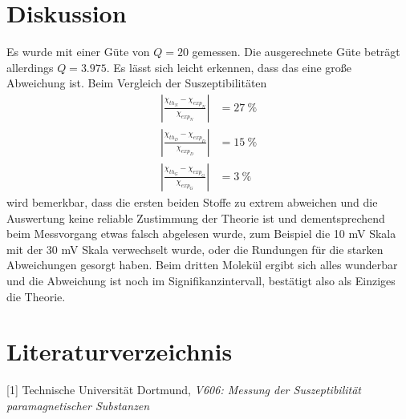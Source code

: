 \documentclass[a4paper]{scrartcl}
\begin{document}
\section{Diskussion}
Es wurde mit einer Güte von $Q=20$ gemessen. Die ausgerechnete Güte beträgt allerdings $Q=3.975$. Es lässt sich leicht erkennen, dass das eine große Abweichung ist. 
Beim Vergleich der Suszeptibilitäten 
\begin{align*}
  |\frac{\chi_{th_{N}}-\chi_{exp_{N}}}{\chi_{exp_{N}}}|&=27\ \%\\
  |\frac{\chi_{th_{D}}-\chi_{exp_{D}}}{\chi_{exp_{D}}}|&=15\ \%\\
  |\frac{\chi_{th_{G}}-\chi_{exp_{G}}}{\chi_{exp_{G}}}|&=3\ \%
\end{align*}
wird bemerkbar, dass die ersten beiden Stoffe zu extrem abweichen und die Auswertung keine reliable Zustimmung der Theorie ist und dementsprechend beim Messvorgang etwas falsch abgelesen wurde, zum Beispiel die 10 mV Skala mit der 30 mV Skala verwechselt wurde, oder die Rundungen für die starken Abweichungen gesorgt haben. Beim dritten Molekül ergibt sich alles wunderbar und die Abweichung ist noch im Signifikanzintervall, bestätigt also als Einziges die Theorie. 

\section{Literaturverzeichnis}

[1] Technische Universität Dortmund, \textit{V606: Messung der Suszeptibilität paramagnetischer
Substanzen}
\end{document}
